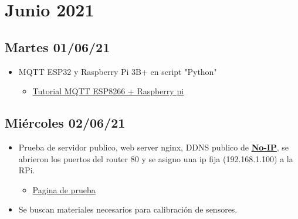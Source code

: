 \section{Junio 2021}

\subsection*{Martes 01/06/21}
    \begin{itemize}
        \item MQTT ESP32 y Raspberry Pi 3B+ en script "Python"
            \begin{itemize}
                 \item \href{https://www.instructables.com/How-to-Use-MQTT-With-the-Raspberry-Pi-and-ESP8266/}{Tutorial MQTT ESP8266 + Raspberry pi}
            \end{itemize}
\end{itemize}

\subsection*{Miércoles 02/06/21}
\begin{itemize}
    \item Prueba de servidor publico, web server nginx, DDNS publico de \href{https://www.noip.com/}{\textbf{No-IP}}, se abrieron los puertos del router 80 y se asigno una ip fija (192.168.1.100) a la RPi. 
    \begin{itemize}
        \item \href{http://facunava.ddns.net}{Pagina de prueba}
    \end{itemize}
    \item Se buscan materiales necesarios para calibración de sensores.
\end{itemize}    
